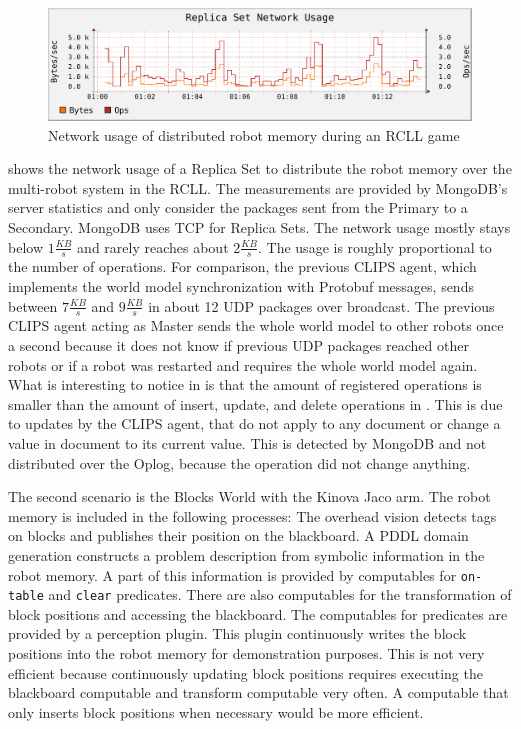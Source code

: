 \begin{figure}
  \centering
  \includegraphics[width=\textwidth]{plots/rsnetwork}
  \caption[Network usage of distributed robot memory during an RCLL game]{Network usage of distributed robot memory during an RCLL game}
  \label{fig:rcll-network}
\end{figure}
 shows the network usage of a Replica Set to
distribute the robot memory over the multi-robot system in the
RCLL. The measurements are provided by MongoDB's server statistics and
only consider the packages sent from the Primary to a
Secondary. MongoDB uses TCP for Replica Sets. The
network usage mostly stays below $1\frac{KB}{s}$ and rarely
reaches about $2\frac{KB}{s}$. The usage is roughly proportional to
the number of operations. For comparison, the previous CLIPS agent,
which implements the world model synchronization with Protobuf
messages, sends between $7\frac{KB}{s}$ and $9\frac{KB}{s}$ in about
12 UDP packages over broadcast. The previous CLIPS agent acting as
Master sends the whole world model to other robots once a second
because it does not know if previous UDP packages reached other robots
or if a robot was restarted and requires the whole world model again.
 What is interesting to notice in  is that
the amount of registered operations is smaller than the amount of
insert, update, and delete operations in . This
is due to updates by the CLIPS agent, that do not apply to any
document or change a value in document to its current value. This is
detected by MongoDB and not distributed over the Oplog, because the
operation did not change anything.

The second scenario is the Blocks World with the Kinova Jaco arm. The
robot memory is included in the following processes: The overhead
vision detects tags on blocks and publishes their position on the
blackboard. A PDDL domain generation constructs a problem description
from symbolic information in the robot memory. A part of this
information is provided by computables for \texttt{on-table} and
\texttt{clear} predicates. There are also computables for the
transformation of block positions and accessing the blackboard. The
computables for predicates are provided by a perception plugin. This
plugin continuously writes the block positions into the robot memory
for demonstration purposes. This is not very efficient because
continuously updating block positions requires executing the
blackboard computable and transform computable very often. A
computable that only inserts block positions when necessary would be
more efficient.


